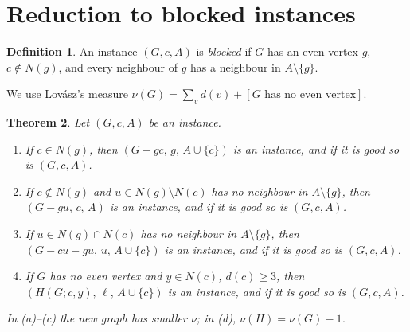 \documentclass[11pt]{amsart}
\newtheorem{theorem}{Theorem}[section]
\theoremstyle{definition}
\newtheorem{definition}[theorem]{Definition}
\begin{document}
\section{Reduction to blocked instances}\label{sec:blocked}

\begin{definition}
An instance $(G,c,A)$ is \emph{blocked} if $G$ has an even vertex $g$, $c\notin N(g)$, and every
neighbour of $g$ has a neighbour in $A\setminus\{g\}$.
\end{definition}

We use Lov\'asz's measure $\nu(G)=\sum_vd(v)+[G\text{ has no even vertex}]$.

\begin{theorem}\label{thm:reductions}
Let $(G,c,A)$ be an instance.
\begin{enumerate}
\item[(a)] If $c\in N(g)$, then $(G-gc,\,g,\,A\cup\{c\})$ is an instance, and if it is good so is
$(G,c,A)$.
\item[(b)] If $c\notin N(g)$ and $u\in N(g)\setminus N(c)$ has no neighbour in $A\setminus\{g\}$, then $(G-gu,\,c,\,A)$
is an instance, and if it is good so is $(G,c,A)$.
\item[(c)] If $u\in N(g)\cap N(c)$ has no neighbour in $A\setminus\{g\}$, then
$(G-cu-gu,\,u,\,A\cup\{c\})$ is an instance, and if it is good so is $(G,c,A)$.
\item[(d)] If $G$ has no even vertex and $y\in N(c)$, $d(c)\ge3$, then $(H(G;c,y),\,\ell,\,A\cup\{c\})$
is an instance, and if it is good so is $(G,c,A)$.
\end{enumerate}
In (a)--(c) the new graph has smaller $\nu$; in (d), $\nu(H)=\nu(G)-1$.
\end{theorem}
\end{document}
